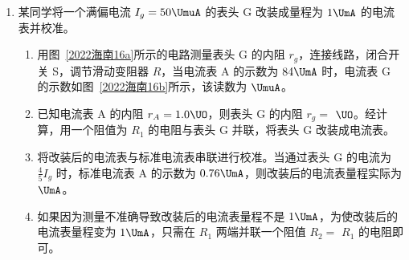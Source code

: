 \documentclass[\gkver]{gaokaozhenti}
\begin{document}
\begin{enumerate}
{	在竖直方向上，连续相等时间 $t$ 内的下落高度之比为 $1:3:5$，可知 $O$ 点的竖直速度为 0，得 $t = \sqrt{\frac{2h}{g}}$，而水平方向上有 $x = vt$，所以 $v = x\sqrt{\frac{g}{2h}}$。
}

\item
某同学将一个满偏电流 $I_{g} = 50 \UmuA$ 的表头 G 改装成量程为 $1 \UmA$ 的电流表并校准。

\begin{enumerate}
	\item
	用图~\ref{2022海南16a}所示的电路测量表头 G 的内阻 $r_{g}$，连接线路，闭合开关 S，调节滑动变阻器 $R$，当电流表 A 的示数为 $84 \UmA$ 时，电流表 G 的示数如图~\ref{2022海南16b}所示，该读数为 $\UmuA$。
	\item
	已知电流表 A 的内阻 $r_{A} = 1.0 \UO$，则表头 G 的内阻 $r_{g} =$  $\UO$。经计算，用一个阻值为 $R_{1}$ 的电阻与表头 G 并联，将表头 G 改装成电流表。
	\item
	将改装后的电流表与标准电流表串联进行校准。当通过表头 G 的电流为 $\frac{4}{5}I_{g}$ 时，标准电流表 A 的示数为 $0.76 \UmA$，则改装后的电流表量程实际为 $\UmA$。
	\item
	如果因为测量不准确导致改装后的电流表量程不是 $1 \UmA$，为使改装后的电流表量程变为 $1 \UmA$，只需在 $R_{1}$ 两端并联一个阻值 $R_{2} =$ $R_{1}$ 的电阻即可。
\end{enumerate}


\end{enumerate}
\end{document}
